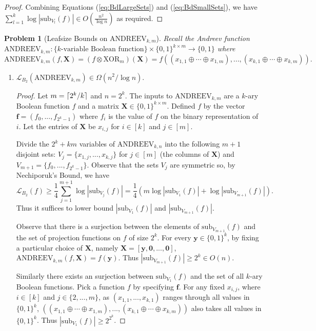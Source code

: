 \documentclass[11pt]{article}
\newcommand\leafsize{\mathcal{L}}
\newcommand\ff[1]{\mathrm{#1}}
\newcommand\vv[1]{\mathbf{#1}}
\newcommand\mm[1]{\mathbf{#1}}
\newcommand\sub{\mathrm{sub}}
\DeclareMathOperator\comp{\otimes}
\DeclareMathOperator\xor{\oplus}
\newtheorem{problem}{Problem}
\DeclarePairedDelimiter\ceil{\lceil}{\rceil}
\begin{document}
\begin{proof}
	Combining Equations (\ref{eq:BdLargeSets}) and (\ref{eq:BdSmallSets}), we have $\sum_{l = 1}^{k}\log|\sub_{V_l}(f)| \in O\left(\frac{n^2}{\log n}\right)$ as required.
\end{proof}
\vspace{1em}
\begin{problem}[Leafsize Bounds on $\ff{ANDREEV}_{k,m}$] 
	Recall the Andreev function $\ff{ANDREEV}_{k,m}: \{\mbox{$k$-variable Boolean function}\} \times \{0,1\}^{k \times m} \rightarrow \{0,1\}$ where 
	\[\ff{ANDREEV}_{k,m}(f, \mm{X}) = \left(f \comp \ff{XOR}_m\right)(\mm{X}) = f\left((x_{1,1}\xor\cdots\xor x_{1,m}), ..., (x_{k,1}\xor\cdots\xor x_{k,m})\right).\]
\end{problem}
\begin{enumerate}
	\item $\leafsize_{B_2}(\ff{ANDREEV}_{k,m}) \in \Omega(n^2/\log n)$.
	\begin{proof}
	Let $m = \ceil{2^k/k}$ and $n = 2^k$. The inputs to $\ff{ANDREEV}_{k,m}$ are a $k$-ary Boolean function $f$ and a matrix $\mm{X} \in \{0,1\}^{k \times m}$. Defined $f$ by the vector $\vv{f} = (f_0, ..., f_{2^{k}-1})$ where $f_i$ is the value of $f$ on the binary representation of $i$. Let the entries of $\mm{X}$ be $x_{i,j}$ for $i \in [k]$ and $j \in [m]$. 
	
	Divide the $2^k + km$ variables of $\ff{ANDREEV}_{k,n}$ into the following $m + 1$ disjoint sets: $V_j = \{x_{1,j}, ..., x_{k,j}\}$ for $j \in [m]$ (the columns of $\mm{X}$) and $V_{m+1} = \{f_0, ..., f_{2^k-1}\}$. Observe that the sets $V_j$ are symmetric so, by Nechiporuk's Bound, we have
	\begin{equation}
		\label{eq:AndreevLb}
		\leafsize_{B_2}(f) \geq\frac{1}{4}\sum_{j = 1}^{m+1}\log|\sub_{V_j}(f)| = \frac{1}{4}\left(m\log|\sub_{V_1}(f)| + \log|\sub_{V_{m+1}}(f)|\right).
	\end{equation}
	Thus it suffices to lower bound $|\sub_{V_1}(f)|$ and $|\sub_{V_{m+1}}(f)|$.
	
	Observe that there is a surjection between the elements of $\sub_{V_{m+1}}(f)$ and the set of projection functions on $f$ of size $2^k$. For every $\vv{y} \in \{0,1\}^k$, by fixing a particular choice of $\mm{X}$, namely $\mm{X} = [\vv{y}, \vv{0}, ..., \vv{0}]$, $\ff{ANDREEV}_{k,m}(f, \mm{X}) = f(\vv{y})$. Thus $|\sub_{V_{m+1}}(f)| \geq 2^k \in O(n)$.
	
	Similarly there exists an surjection between $\sub_{V_{1}}(f)$ and the set of all $k$-ary Boolean functions. Pick a function $f$ by specifying $\vv{f}$. For any fixed $x_{i,j}$, where $i \in [k]$ and $j \in \{2,...,m\}$, as $(x_{1,1}, ..., x_{k,1})$ ranges through all values in $\{0,1\}^k$, $((x_{1,1} \xor \cdots \xor x_{1,m}), ..., (x_{k,1} \xor \cdots \xor x_{k,m}))$ also takes all values in $\{0,1\}^k$. Thus $|\sub_{V_1}(f)| \geq 2^{2^k}$.
	

\end{proof}
\end{enumerate}
\end{document}

